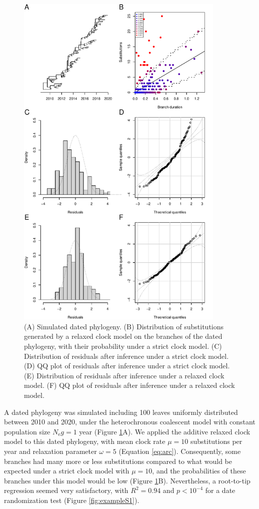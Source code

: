 \documentclass{article}
\begin{document}
\begin{figure}[p!]
\begin{center}
\includegraphics[width=10cm]{example.pdf}
\end{center}
\caption{(A) Simulated dated phylogeny. (B) Distribution of substitutions generated by a relaxed clock model
on the branches of the dated phylogeny, with their probability under a strict clock model. 
(C) Distribution of residuals after inference under a strict clock model. 
(D) QQ plot of residuals after inference under a strict clock model.
(E) Distribution of residuals after inference under a relaxed clock model. 
(F) QQ plot of residuals after inference under a relaxed clock model.
\label{fig:example}}
\end{figure}

A dated phylogeny was simulated including 100 leaves uniformly distributed between 2010 and 2020, 
under the heterochronous coalescent model \citep{Drummond2002}
with constant population size $N_\mathrm{e}g=1$ year (Figure \ref{fig:example}A). 
We applied the additive relaxed clock model \citep{Didelot2021} to this dated phylogeny,
with mean clock rate $\mu=10$ substitutions per year and relaxation parameter $\omega=5$ (Equation \ref{eq:arc}).
Consequently, some branches had many more or less substitutions compared to what would be expected
under a strict clock model with $\mu=10$, and the probabilities of these branches
under this model would be low (Figure \ref{fig:example}B). Nevertheless, a root-to-tip regression seemed
very satisfactory, with $R^2=0.94$ and $p<10^{-4}$ for 
a date randomization test (Figure \ref{fig:exampleS1}).
\end{document}
